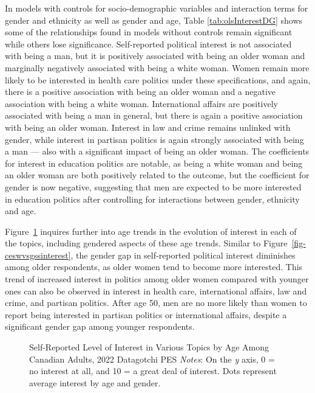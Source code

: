 \documentclass[
  letterpaper,
  DIV=11,
  numbers=noendperiod]{scrreprt}
\begin{document}
In models with controls for socio-demographic variables and interaction
terms for gender and ethnicity as well as gender and age, Table
\ref{tab:olsInterestDG} shows some of the relationships found in models
without controls remain significant while others lose significance.
Self-reported political interest is not associated with being a man, but
it is positively associated with being an older woman and marginally
negatively associated with being a white woman. Women remain more likely
to be interested in health care politics under these specifications, and
again, there is a positive association with being an older woman and a
negative association with being a white woman. International affairs are
positively associated with being a man in general, but there is again a
positive association with being an older woman. Interest in law and
crime remains unlinked with gender, while interest in partisan politics
is again strongly associated with being a man --- also with a
significant impact of being an older woman. The coefficients for
interest in education politics are notable, as being a white woman and
being an older woman are both positively related to the outcome, but the
coefficient for gender is now negative, suggesting that men are expected
to be more interested in education politics after controlling for
interactions between gender, ethnicity and age.

Figure~\ref{fig-datagotchi} inquires further into age trends in the
evolution of interest in each of the topics, including gendered aspects
of these age trends. Similar to Figure~\ref{fig-ceswvsgssinterest}, the
gender gap in self-reported political interest diminishes among older
respondents, as older women tend to become more interested. This trend
of increased interest in politics among older women compared with
younger ones can also be observed in interest in health care,
international affairs, law and crime, and partisan politics. After age
50, men are no more likely than women to report being interested in
partisan politics or international affairs, despite a significant gender
gap among younger respondents.

\begin{figure}


\caption{\label{fig-datagotchi}Self-Reported Level of Interest in
Various Topics by Age Among Canadian Adults, 2022 Datagotchi PES
\newline \textit{Notes}: On the \textit{y} axis, 0 = no interest at all,
and 10 = a great deal of interest. Dots represent average interest by
age and gender.}

\end{figure}%
\end{document}
